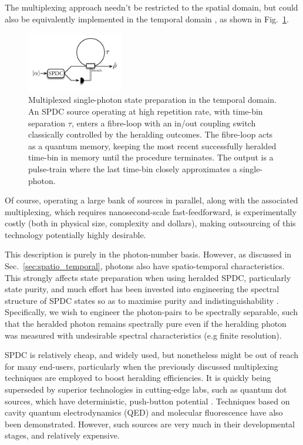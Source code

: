 The multiplexing approach needn't be restricted to the spatial domain, but could also be equivalently implemented in the temporal domain \cite{bib:RohdeLoopMulti15, mosley, othersSeePaper}, as shown in Fig.~\ref{fig:SPDC_time_multiplexing}.

\begin{figure}[!htb]
\includegraphics[width=0.375\textwidth]{SPDC_time_multiplexing}
\caption{Multiplexed single-photon state preparation in the temporal domain. An SPDC source operating at high repetition rate, with time-bin separation $\tau$, enters a fibre-loop with an in/out coupling switch classically controlled by the heralding outcomes. The fibre-loop acts as a quantum memory, keeping the most recent successfully heralded time-bin in memory until the procedure terminates. The output is a pulse-train where the last time-bin closely approximates a single-photon.} \label{fig:SPDC_time_multiplexing}
\end{figure}

Of course, operating a large bank of sources in parallel, along with the associated multiplexing, which requires nanosecond-scale fast-feedforward, is experimentally costly (both in physical size, complexity and dollars), making outsourcing of this technology potentially highly desirable.

This description is purely in the photon-number basis. However, as discussed in Sec.~\ref{sec:spatio_temporal}, photons also have spatio-temporal characteristics. This strongly affects state preparation when using heralded SPDC, particularly state purity, and much effort has been invested into engineering the spectral structure of SPDC states so as to maximise purity and indistinguishability \cite{bib:Aichele02, bib:Branning00}. Specifically, we wish to engineer the photon-pairs to be spectrally separable, such that the heralded photon remains spectrally pure even if the heralding photon was measured with undesirable spectral characteristics (e.g finite resolution).

SPDC is relatively cheap, and widely used, but nonetheless might be out of reach for many end-users, particularly when the previously discussed multiplexing techniques are employed to boost heralding efficiencies. It is quickly being superseded by superior technologies in cutting-edge labs, such as quantum dot sources, which have deterministic, push-button potential \cite{bib:Santori01, bib:Kiraz04}. Techniques based on cavity quantum electrodynamics (QED) \cite{bib:Brattke01} and molecular fluorescence \cite{bib:Brunel99} have also been demonstrated. However, such sources are very much in their developmental stages, and relatively expensive.

